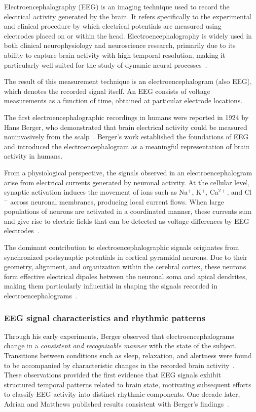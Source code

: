 Electroencephalography (EEG) is an imaging technique used to record the electrical activity generated by the brain. It refers specifically to the experimental and clinical procedure by which electrical potentials are measured using electrodes placed on or within the head. Electroencephalography is widely used in both clinical neurophysiology and neuroscience research, primarily due to its ability to capture brain activity with high temporal resolution, making it particularly well suited for the study of dynamic neural processes~\cite{st-louis-2016}.

The result of this measurement technique is an electroencephalogram (also EEG), which denotes the recorded signal itself. An EEG consists of voltage measurements as a function of time, obtained at particular electrode locations. 

The first electroencephalographic recordings in humans were reported in 1924 by Hans Berger, who demonstrated that brain electrical activity could be measured noninvasively from the scalp~\cite{st-louis-2016}. Berger’s work established the foundations of EEG and introduced the electroencephalogram as a meaningful representation of brain activity in humans.

From a physiological perspective, the signals observed in an electroencephalogram arise from electrical currents generated by neuronal activity. At the cellular level, synaptic activation induces the movement of ions such as Na$^+$, K$^+$, Ca$^{2+}$, and Cl$^-$ across neuronal membranes, producing local current flows. When large populations of neurons are activated in a coordinated manner, these currents sum and give rise to electric fields that can be detected as voltage differences by EEG electrodes~\cite{abhang-2016,cherian-2024}.

The dominant contribution to electroencephalographic signals originates from synchronized postsynaptic potentials in cortical pyramidal neurons. Due to their geometry, alignment, and organization within the cerebral cortex, these neurons form effective electrical dipoles between the neuronal soma and apical dendrites, making them particularly influential in shaping the signals recorded in electroencephalograms~\cite{abhang-2016}.

\subsubsection{EEG signal characteristics and rhythmic patterns}
Through his early experiments, Berger observed that electroencephalograms change in a \textit{consistent and recognizable manner} with the state of the subject. Transitions between conditions such as sleep, relaxation, and alertness were found to be accompanied by characteristic changes in the recorded brain activity~\cite{st-louis-2016,abhang-2016}. These observations provided the first evidence that EEG signals exhibit structured temporal patterns related to brain state, motivating subsequent efforts to classify EEG activity into distinct rhythmic components. One decade later, Adrian and Matthews published results consistent with Berger’s findings~\cite{abhang-2016}.

